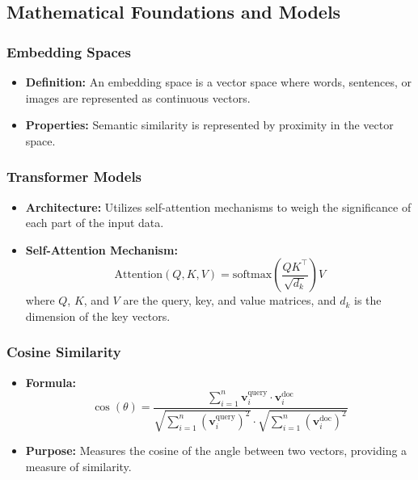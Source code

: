 \documentclass[12pt]{article}
\begin{document}
\subsection{Mathematical Foundations and Models}

\subsubsection{Embedding Spaces}

\begin{itemize}
    \item \textbf{Definition:} An embedding space is a vector space where words, sentences, or images are represented as continuous vectors.
    \item \textbf{Properties:} Semantic similarity is represented by proximity in the vector space.
\end{itemize}

\subsubsection{Transformer Models}

\begin{itemize}
    \item \textbf{Architecture:} Utilizes self-attention mechanisms to weigh the significance of each part of the input data.
    \item \textbf{Self-Attention Mechanism:}
    \[
    \text{Attention}(Q, K, V) = \text{softmax}\left( \frac{QK^\top}{\sqrt{d_k}} \right)V
    \]
    where \( Q \), \( K \), and \( V \) are the query, key, and value matrices, and \( d_k \) is the dimension of the key vectors.
\end{itemize}

\subsubsection{Cosine Similarity}

\begin{itemize}
    \item \textbf{Formula:}
    \[
    \cos(\theta) = \frac{\sum_{i=1}^{n} \mathbf{v}_{i}^{\text{query}} \cdot \mathbf{v}_{i}^{\text{doc}}}{\sqrt{\sum_{i=1}^{n} (\mathbf{v}_{i}^{\text{query}})^2} \cdot \sqrt{\sum_{i=1}^{n} (\mathbf{v}_{i}^{\text{doc}})^2}}
    \]
    \item \textbf{Purpose:} Measures the cosine of the angle between two vectors, providing a measure of similarity.
\end{itemize}
\end{document}
